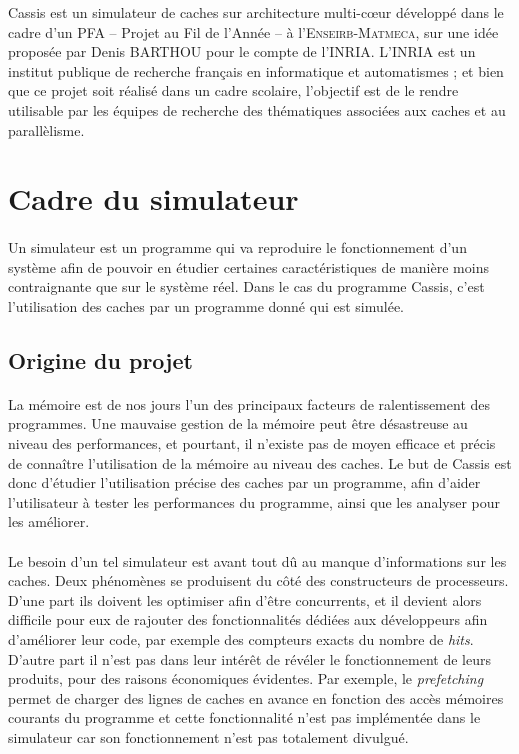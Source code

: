 \textsf{Cassis} est un simulateur de caches sur architecture multi-c\oe ur développé dans le cadre d'un PFA -- Projet au Fil de l'Année -- à l'\textsc{Enseirb-Matmeca}, sur une idée proposée par Denis BARTHOU pour le compte de l'\textsf{INRIA}. L'\textsf{INRIA} est un institut publique de recherche français en informatique et automatismes ; et bien que ce projet soit réalisé dans un cadre scolaire, l'objectif est de le rendre utilisable par les équipes de recherche des thématiques associées aux caches et au parallèlisme.

\section{Cadre du simulateur}

\paragraph{}
Un simulateur est un programme qui va reproduire le fonctionnement d'un système afin de pouvoir en étudier certaines caractéristiques de manière moins contraignante que sur le système réel. Dans le cas du programme \textsf{Cassis}, c'est l'utilisation des caches par un programme donné qui est simulée.

\subsection{Origine du projet}

\paragraph{}
La mémoire est de nos jours l'un des principaux facteurs de ralentissement des programmes. Une mauvaise gestion de la mémoire peut être désastreuse au niveau des performances, et pourtant, il n'existe pas de moyen efficace et précis de connaître l'utilisation de la mémoire au niveau des caches. Le but de \textsf{Cassis} est donc d'étudier l'utilisation précise des caches par un programme, afin d'aider l'utilisateur à tester les performances du programme, ainsi que les analyser pour les améliorer.

\paragraph{}
Le besoin d'un tel simulateur est avant tout dû au manque d'informations sur les caches. Deux phénomènes se produisent du côté des constructeurs de processeurs. D'une part ils doivent les optimiser afin d'être concurrents, et il devient alors difficile pour eux de rajouter des fonctionnalités dédiées aux développeurs afin d'améliorer leur code, par exemple des compteurs exacts du nombre de \emph{hits}. D'autre part il n'est pas dans leur intérêt de révéler le fonctionnement de leurs produits, pour des raisons économiques évidentes. Par exemple, le \emph{prefetching} permet de charger des lignes de caches en avance en fonction des accès mémoires courants du programme et cette fonctionnalité n'est pas implémentée dans le simulateur car son fonctionnement n'est pas totalement divulgué.

